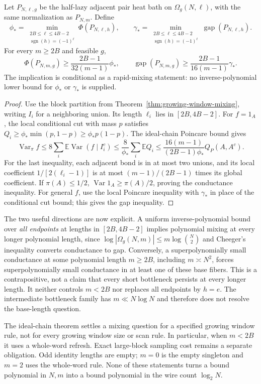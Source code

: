 \begin{theorem}
\label{thm:base-length-reduction}
Let $P_{N,\ell,g}$ be the half-lazy adjacent pair heat bath on
$\Omega_g(N,\ell)$, with the same normalization as $P_{N,m}$.
Define
\[
 \phi_* =\min_{\substack{2B\le\ell\le4B-2\\
                   \operatorname{sgn}(h)=(-1)^\ell}}
                    \Phi(P_{N,\ell,h}),\qquad
 \gamma_* =\min_{\substack{2B\le\ell\le4B-2\\
                   \operatorname{sgn}(h)=(-1)^\ell}}
                    \operatorname{gap}(P_{N,\ell,h}).
\]
For every $m\ge2B$ and feasible $g$,
\[
 \Phi(P_{N,m,g})\ge\frac{2B-1}{32(m-1)}\phi_*,\qquad
 \operatorname{gap}(P_{N,m,g})
       \ge\frac{2B-1}{16(m-1)}\gamma_*.              \tag{GW.4}
\]
The implication is conditional as a rapid-mixing statement: no
inverse-polynomial lower bound for $\phi_*$ or $\gamma_*$ is supplied.
\end{theorem}
\begin{proof}
Use the block partition from Theorem~\ref{thm:growing-window-mixing},
writing $I_i$ for a neighboring union.  Its length $\ell_i$ lies in
$[2B,4B-2]$.  For $f=1_A$, the local conditional cut with mass $p$
satisfies $Q_i\ge\phi_*\min(p,1-p)\ge\phi_*p(1-p)$.
The ideal-chain Poincare bound gives
\[
 \operatorname{Var}_\pi f
 \le8\sum_i\mathbb E\operatorname{Var}(f\mid I_i^c)
 \le\frac8{\phi_*}\sum_i\mathbb E Q_i
 \le\frac{16(m-1)}{(2B-1)\phi_*}Q_P(A,A^c).
\]
For the last inequality, each adjacent bond is in at most two unions,
and its local coefficient $1/[2(\ell_i-1)]$ is at most
$(m-1)/(2B-1)$ times its global coefficient.  If $\pi(A)\le1/2$,
$\operatorname{Var}1_A\ge\pi(A)/2$, proving the conductance inequality.
For general $f$, use the local Poincare inequality with $\gamma_*$ in
place of the conditional cut bound; this gives the gap inequality.
\end{proof}

The two useful directions are now explicit.  A uniform inverse-polynomial
bound over \emph{all endpoints} at lengths in $[2B,4B-2]$ implies polynomial
mixing at every longer polynomial length, since
$\log|\Omega_g(N,m)|\le m\log\binom N2$ and Cheeger's inequality converts
conductance to gap.  Conversely, a superpolynomially small conductance at
some polynomial length $m\ge2B$, including $m\asymp N^2$, forces
superpolynomially small conductance in at least one of these base fibers.
This is a contrapositive, not a claim that every short bottleneck persists
at every longer length.  It neither controls $m<2B$ nor replaces all
endpoints by $h=e$.  The intermediate bottleneck family has $m\ll N\log N$
and therefore does not resolve the base-length question.

The ideal-chain theorem settles a mixing question for a specified growing
window rule, not for every growing window size or scan rule.  In particular,
when $m<2B$ it uses a whole-word refresh.  Exact large-block sampling cost
remains a separate obligation.  Odd identity lengths are empty; $m=0$ is
the empty singleton and $m=2$ uses the whole-word rule.  None of these
statements turns a bound polynomial in $N,m$ into a bound polynomial in
the wire count $\log_2N$.
